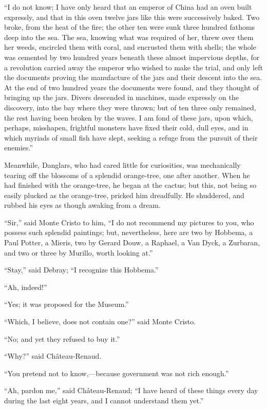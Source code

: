 “I do not know; I have only heard that an emperor of China had an oven
built expressly, and that in this oven twelve jars like this were
successively baked. Two broke, from the heat of the fire; the other ten
were sunk three hundred fathoms deep into the sea. The sea, knowing
what was required of her, threw over them her weeds, encircled them
with coral, and encrusted them with shells; the whole was cemented by
two hundred years beneath these almost impervious depths, for a
revolution carried away the emperor who wished to make the trial, and
only left the documents proving the manufacture of the jars and their
descent into the sea. At the end of two hundred years the documents
were found, and they thought of bringing up the jars. Divers descended
in machines, made expressly on the discovery, into the bay where they
were thrown; but of ten three only remained, the rest having been
broken by the waves. I am fond of these jars, upon which, perhaps,
misshapen, frightful monsters have fixed their cold, dull eyes, and in
which myriads of small fish have slept, seeking a refuge from the
pursuit of their enemies.”

Meanwhile, Danglars, who had cared little for curiosities, was
mechanically tearing off the blossoms of a splendid orange-tree, one
after another. When he had finished with the orange-tree, he began at
the cactus; but this, not being so easily plucked as the orange-tree,
pricked him dreadfully. He shuddered, and rubbed his eyes as though
awaking from a dream.

“Sir,” said Monte Cristo to him, “I do not recommend my pictures to
you, who possess such splendid paintings; but, nevertheless, here are
two by Hobbema, a Paul Potter, a Mieris, two by Gerard Douw, a Raphael,
a Van Dyck, a Zurbaran, and two or three by Murillo, worth looking at.”

“Stay,” said Debray; “I recognize this Hobbema.”

“Ah, indeed!”

“Yes; it was proposed for the Museum.”

“Which, I believe, does not contain one?” said Monte Cristo.

“No; and yet they refused to buy it.”

“Why?” said Château-Renaud.

“You pretend not to know,—because government was not rich enough.”

“Ah, pardon me,” said Château-Renaud; “I have heard of these things
every day during the last eight years, and I cannot understand them
yet.”

